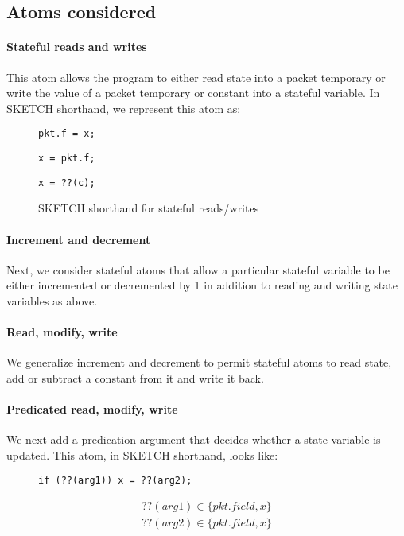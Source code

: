 \subsection{Atoms considered}
\paragraph{Stateful reads and writes}
This atom allows the program to either read state into a packet temporary or write the
value of a packet temporary or constant into a stateful variable. In SKETCH shorthand,
we represent this atom as:
\begin{figure}
\begin{lstlisting}[style=customc]
pkt.f = x;
\end{lstlisting}
\begin{lstlisting}[style=customc]
x = pkt.f;
\end{lstlisting}
\begin{lstlisting}[style=customc]
x = ??(c);
\end{lstlisting}
\caption{SKETCH shorthand for stateful reads/writes}
\label{fig:read/write}
\end{figure}

\paragraph{Increment and decrement}
Next, we consider stateful atoms that allow a particular stateful variable to
be either incremented or decremented by 1 in addition to reading and writing
state variables as above.

\paragraph{Read, modify, write}
We generalize increment and decrement to permit stateful atoms to read state,
add or subtract a constant from it and write it back.

\paragraph{Predicated read, modify, write}
We next add a predication argument that decides whether a state variable is
updated. This atom, in SKETCH shorthand, looks like:
\begin{figure}
\begin{lstlisting}[style=customc]
  if (??(arg1)) x = ??(arg2);
\end{lstlisting}
\begin{eqnarray*}
  ??(arg1) \in \{pkt.field, x\} \\
  ??(arg2) \in \{pkt.field, x\}
\end{eqnarray*}
\end{figure}

